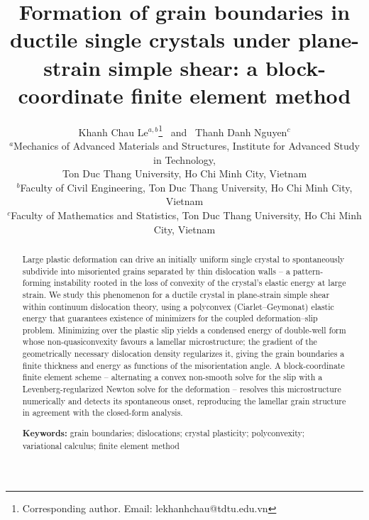 \documentclass[12pt]{article}
\theoremstyle{plain}
\theoremstyle{definition}
\begin{document}
\title{Formation of grain boundaries in ductile single crystals under
plane-strain simple shear: a block-coordinate finite element method}

\author{Khanh Chau Le$^{a,b}$\thanks{Corresponding author. Email: lekhanhchau@tdtu.edu.vn}
  \ and \ Thanh Danh Nguyen$^{c}$\\[6pt]
  \small $^{a}$Mechanics of Advanced Materials and Structures, Institute for Advanced   Study in Technology,\\
  \small Ton Duc Thang University, Ho Chi Minh City, Vietnam\\
  \small $^{b}$Faculty of Civil Engineering, Ton Duc Thang University, Ho Chi Minh City, Vietnam\\
  \small $^{c}$Faculty of Mathematics and Statistics, Ton Duc Thang University, Ho Chi Minh City, Vietnam}
\date{}
 
\maketitle

\begin{abstract}
\noindent
Large plastic deformation can drive an initially uniform single crystal to
spontaneously subdivide into misoriented grains separated by thin dislocation
walls -- a pattern-forming instability rooted in the loss of convexity of the
crystal's elastic energy at large strain. We study this phenomenon for a
ductile crystal in plane-strain simple shear within continuum dislocation
theory, using a polyconvex (Ciarlet--Geymonat) elastic energy that guarantees
existence of minimizers for the coupled deformation--slip problem. Minimizing
over the plastic slip yields a condensed energy of double-well form whose
non-quasiconvexity favours a lamellar microstructure; the gradient of the
geometrically necessary dislocation density regularizes it, giving the grain
boundaries a finite thickness and energy as functions of the misorientation
angle. A block-coordinate finite element scheme -- alternating a convex
non-smooth solve for the slip with a Levenberg-regularized Newton solve for
the deformation -- resolves this microstructure numerically and detects its
spontaneous onset, reproducing the lamellar grain structure in agreement with
the closed-form analysis.
 
\medskip
\noindent\textbf{Keywords:} grain boundaries; dislocations; crystal
plasticity; polyconvexity; variational calculus; finite element method
\end{abstract}
\end{document}
